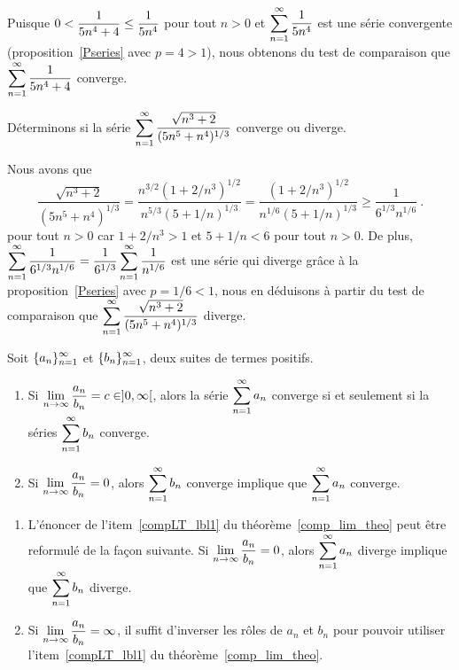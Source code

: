{\begin{egg}
Puisque $\displaystyle 0 < \frac{1}{5n^4 + 4} \leq \frac{1}{5n^4}$ pour
tout $n>0$ et $\displaystyle \sum_{n=1}^\infty \frac{1}{5n^4}$
est une série convergente (proposition~\ref{Pseries} avec $p = 4>1$), nous
obtenons du test de comparaison que
$\displaystyle \sum_{n=1}^\infty \frac{1}{5n^4 + 4}$ converge.
\end{egg}

\begin{egg}
Déterminons si la série
$\displaystyle \sum_{n=1}^\infty \frac{\sqrt{n^3+2}}{(5n^5+n^4)^{1/3}}$
converge ou diverge.

Nous avons que
\[
\frac{\sqrt{n^3+2}}{(5n^5+n^4)^{1/3}}
= \frac{n^{3/2}(1+2/n^3)^{1/2}}{n^{5/3}(5+1/n)^{1/3}}
= \frac{(1+2/n^3)^{1/2}}{n^{1/6}(5+1/n)^{1/3}}
\geq \frac{1}{6^{1/3} n^{1/6}} \ .
\]
pour tout $n>0$ car $1 + 2/n^3 > 1$ et $5+1/n < 6$ pour tout $n>0$.
De plus, $\displaystyle \sum_{n=1}^\infty \frac{1}{6^{1/3} n^{1/6}}
= \frac{1}{6^{1/3}} \sum_{n=1}^\infty \frac{1}{n^{1/6}}$
est une série qui diverge grâce à la proposition~\ref{Pseries} avec
$p=1/6 <1$, nous en
déduisons à partir du test de comparaison que
$\displaystyle \sum_{n=1}^\infty \frac{\sqrt{n^3+2}}{(5n^5+n^4)^{1/3}}$
diverge.
\end{egg}

\begin{theorem}
Soit $\displaystyle \{a_n\}_{n=1}^\infty$ et
$\displaystyle \{b_n\}_{n=1}^\infty$, deux suites de termes positifs.
\begin{enumerate}
\item Si $\displaystyle \lim_{n\rightarrow \infty} \frac{a_n}{b_n} = c
\in ]0,\infty[$, alors la série $\displaystyle \sum_{n=1}^\infty a_n$
converge si et seulement si la séries 
$\displaystyle \sum_{n=1}^\infty b_n$ converge.
\item \label{compLT_lbl1}
Si $\displaystyle \lim_{n\rightarrow \infty} \frac{a_n}{b_n} = 0$, alors
$\displaystyle \sum_{n=1}^\infty b_n$ converge implique que
$\displaystyle \sum_{n=1}^\infty a_n$ converge.
\end{enumerate}
\label{comp_lim_theo}
\end{theorem}

\begin{rmkList}
\begin{enumerate}
\item L'énoncer de l'item~\ref{compLT_lbl1} du
théorème~\ref{comp_lim_theo} peut être reformulé de la façon
suivante.  Si
$\displaystyle \lim_{n\rightarrow \infty} \frac{a_n}{b_n} = 0$, alors 
$\displaystyle \sum_{n=1}^\infty a_n$ diverge implique que
$\displaystyle \sum_{n=1}^\infty b_n$ diverge.
\item Si $\displaystyle \lim_{n\rightarrow \infty} \frac{a_n}{b_n} = \infty$,
il suffit d'inverser les rôles de $a_n$ et $b_n$ pour pouvoir utiliser
l'item~\ref{compLT_lbl1} du théorème~\ref{comp_lim_theo}.
\end{enumerate}
\end{rmkList}

}
